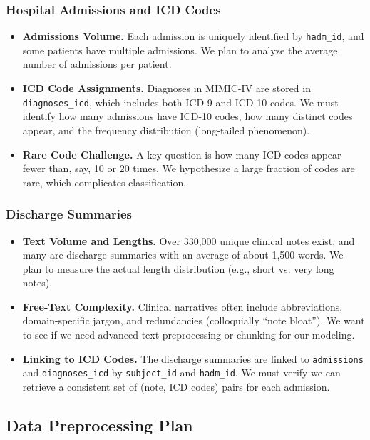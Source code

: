 \subsubsection{Hospital Admissions and ICD Codes}
\begin{itemize}
    \item \textbf{Admissions Volume.} Each admission is uniquely identified by \texttt{hadm\_id}, and some patients have multiple admissions. We plan to analyze the average number of admissions per patient.
    \item \textbf{ICD Code Assignments.} Diagnoses in MIMIC-IV are stored in \texttt{diagnoses\_icd}, which includes both ICD-9 and ICD-10 codes. We must identify how many admissions have ICD-10 codes, how many distinct codes appear, and the frequency distribution (long-tailed phenomenon).
    \item \textbf{Rare Code Challenge.} A key question is how many ICD codes appear fewer than, say, 10 or 20 times. We hypothesize a large fraction of codes are rare, which complicates classification.
\end{itemize}

\subsubsection{Discharge Summaries}
\begin{itemize}
    \item \textbf{Text Volume and Lengths.} Over 330,000 unique clinical notes exist, and many are discharge summaries with an average of about 1,500 words. We plan to measure the actual length distribution (e.g., short vs. very long notes).
    \item \textbf{Free-Text Complexity.} Clinical narratives often include abbreviations, domain-specific jargon, and redundancies (colloquially “note bloat”). We want to see if we need advanced text preprocessing or chunking for our modeling.
    \item \textbf{Linking to ICD Codes.} The discharge summaries are linked to \texttt{admissions} and \texttt{diagnoses\_icd} by \texttt{subject\_id} and \texttt{hadm\_id}. We must verify we can retrieve a consistent set of (note, ICD codes) pairs for each admission.
\end{itemize}

\subsection{Data Preprocessing Plan}

